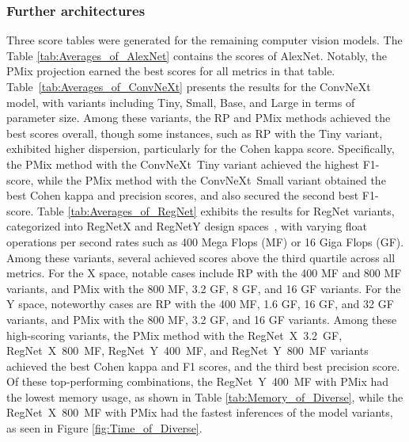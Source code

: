 




\FloatBarrier


\subsubsection{Further architectures}

Three score tables were generated for the remaining computer vision models.
The Table \ref{tab:Averages_of_AlexNet} contains the scores of AlexNet. Notably, the \gls{PMix} projection earned the best scores for all metrics in that table.
Table~\ref{tab:Averages_of_ConvNeXt} presents the results for the ConvNeXt model, with variants including Tiny, Small, Base, and Large in terms of parameter size. Among these variants, the \gls{RP} and \gls{PMix} methods achieved the best scores overall, though some instances, such as \gls{RP} with the Tiny variant, exhibited higher dispersion, particularly for the Cohen kappa score. Specifically, the \gls{PMix} method with the \mbox{ConvNeXt Tiny} variant achieved the highest F1-score, while the \gls{PMix} method with the \mbox{ConvNeXt Small} variant obtained the best Cohen kappa and precision scores, and also secured the second best F1-score.
Table \ref{tab:Averages_of_RegNet} exhibits the results for RegNet variants, categorized into RegNetX and RegNetY design spaces~\cite{RegNet}, with varying float operations per second rates such as 400 Mega Flops (MF) or 16 Giga Flops (GF). Among these variants, several achieved scores above the third quartile across all metrics. For the X space, notable cases include \gls{RP} with the 400 MF and 800 MF variants, and \gls{PMix} with the 800 MF, 3.2 GF, 8 GF, and 16 GF variants. For the Y space, noteworthy cases are \gls{RP} with the 400 MF, 1.6 GF, 16 GF, and 32 GF variants, and \gls{PMix} with the 800 MF, 3.2 GF, and 16 GF variants. Among these high-scoring variants, the \gls{PMix} method with the \mbox{RegNet X 3.2 GF}, \mbox{RegNet X 800 MF}, \mbox{RegNet Y 400 MF}, and \mbox{RegNet Y 800 MF} variants achieved the best Cohen kappa and F1 scores, and the third best precision score. Of these top-performing combinations, the \mbox{RegNet Y 400 MF} with \gls{PMix} had the lowest memory usage, as shown in Table \ref{tab:Memory_of_Diverse}, while the \mbox{RegNet X 800 MF} with \gls{PMix} had the fastest inferences of the model variants, as seen in Figure \ref{fig:Time_of_Diverse}.
